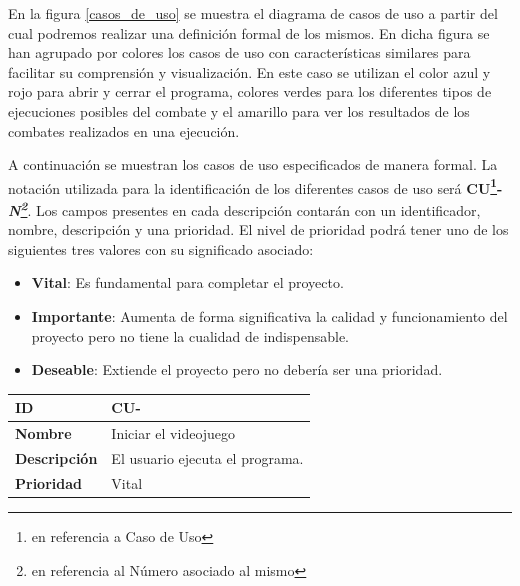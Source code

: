 \clearpage

En la figura \ref{casos_de_uso} se muestra el diagrama de casos de uso a partir del cual podremos realizar una definición formal de los mismos. En dicha figura se han agrupado por colores los casos de uso con características similares para facilitar su comprensión y visualización. En este caso se utilizan el color azul y rojo para abrir y cerrar el programa, colores verdes para los diferentes tipos de ejecuciones posibles del combate y el amarillo para ver los resultados de los combates realizados en una ejecución.

\bigskip

A continuación se muestran los casos de uso especificados de manera formal. La notación utilizada para la identificación de los diferentes casos de uso será \textbf{CU\footnote{en referencia a Caso de Uso}-\textit{N\footnote{en referencia al Número asociado al mismo}}}. Los campos presentes en cada descripción contarán con un identificador, nombre, descripción y una prioridad. El nivel de prioridad podrá tener uno de los siguientes tres valores con su significado asociado:

\begin{itemize}
\item \textbf{Vital}: Es fundamental para completar el proyecto.
\item \textbf{Importante}: Aumenta de forma significativa la calidad y funcionamiento del proyecto pero no tiene la cualidad de indispensable.
\item \textbf{Deseable}: Extiende el proyecto pero no debería ser una prioridad.
\end{itemize}

\bigskip



\setcounter{contador_casos_de_uso}{1}

\begin{center}
	\begin{tabular}{ | p{3cm} | p{10cm} | } 
		\hline
		
			\textbf{ID} & CU-\arabic{contador_casos_de_uso}
			{contador_casos_de_uso} \\
		
		\hline 
		
			\textbf{Nombre} &
			Iniciar el videojuego \\ 
		
		\hline
		
			\textbf{Descripción} & 
			El usuario ejecuta el programa.\\
		
		\hline 
		
			\textbf{Prioridad} &
			Vital\\ 
		
		\hline
	\end{tabular}
\end{center}


